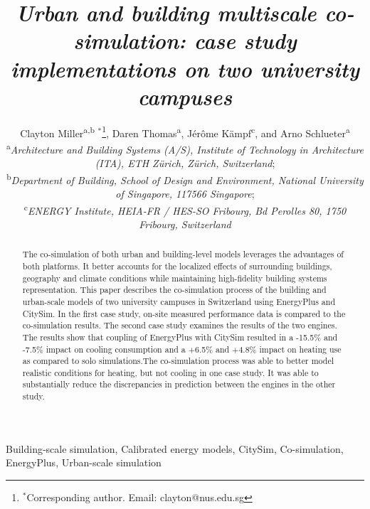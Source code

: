 \documentclass{tBPS2e}
\theoremstyle{plain}
\theoremstyle{definition}
\theoremstyle{remark}
\begin{document}


\title{\textit{Urban and building multiscale co-simulation: case study implementations on two university campuses}}

\author{Clayton Miller\textsuperscript{a,b}%
$^{\ast}$\thanks{$^\ast$Corresponding author. Email: clayton@nus.edu.sg}, 
Daren Thomas\textsuperscript{a},
J\'er\^ome K\"ampf\textsuperscript{c},
and Arno Schlueter\textsuperscript{a}\\
\vspace{6pt}
\textsuperscript{a}{\em Architecture and Building Systems (A/S), Institute of Technology in Architecture (ITA), ETH Z\"urich, Z\"urich, Switzerland};\\
\textsuperscript{b}{\em Department of Building, School of Design and Environment, National University of Singapore, 117566 Singapore};\\
\textsuperscript{c}{\em ENERGY Institute, HEIA-FR / HES-SO Fribourg, Bd Perolles 80, 1750 Fribourg, Switzerland}
}

\maketitle

\begin{abstract}
The co-simulation of both urban and building-level models leverages the advantages of both platforms. 
It better accounts for the localized effects of surrounding buildings, geography and climate conditions 
while maintaining high-fidelity building systems representation. This paper describes the co-simulation process 
of the building and urban-scale models of two university campuses in Switzerland using EnergyPlus and CitySim. 
In the first case study, on-site measured performance data is compared to the co-simulation results. 
The second case study examines the results of the two engines. The results show that coupling of EnergyPlus with 
CitySim resulted in a -15.5\% and -7.5\% impact on cooling consumption and a +6.5\% and +4.8\% impact on heating 
use as compared to solo simulations.The co-simulation process was able to better model realistic conditions for 
heating, but not cooling in one case study. It was able to substantially reduce the discrepancies in prediction between the engines in the other study.
\end{abstract}

\begin{keywords}
Building-scale simulation, Calibrated energy models, CitySim, Co-simulation, EnergyPlus, Urban-scale simulation 
\end{keywords}
\end{document}
